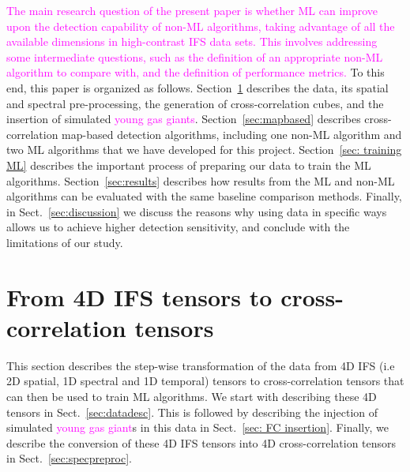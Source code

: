 \documentclass[referee]{aa} %
\newcommand{\newchange}[1]{\textcolor{magenta}{#1}}
\begin{document}
\newchange{The main research question of the present paper is whether ML can improve upon the detection capability of non-ML algorithms, taking advantage of all the available dimensions in high-contrast IFS data sets. This involves addressing some intermediate questions, such as the definition of an appropriate non-ML algorithm to compare with, and the definition of performance metrics.}
To this end, this paper is organized as follows. Section~\ref{sec:data} describes the data, its spatial and spectral pre-processing, the generation of cross-correlation cubes, and the insertion of simulated \newchange{young gas giants}.
Section~\ref{sec:mapbased} describes cross-correlation map-based detection algorithms, including one non-ML algorithm and two ML algorithms that we have developed for this project.
Section~\ref{sec: training ML} describes the important process of preparing our data to train the ML algorithms.
Section~\ref{sec:results} describes how results from the ML and non-ML algorithms can be evaluated with the same baseline comparison methods.
Finally, in Sect.~\ref{sec:discussion} we discuss the reasons why using data in specific ways allows us to achieve higher detection sensitivity, and conclude with the limitations of our study.
\section{From 4D IFS tensors to cross-correlation tensors}\label{sec:data}

This section describes the step-wise transformation of the data from 4D IFS (i.e 2D spatial, 1D spectral and 1D temporal) tensors to cross-correlation tensors that can then be used to train ML algorithms.
We start with describing these 4D tensors in Sect.~\ref{sec:datadesc}.
This is followed by describing the injection of simulated \newchange{young gas giant}s in this data in Sect.~\ref{sec: FC insertion}.
Finally, we describe the conversion of these 4D IFS tensors into 4D cross-correlation tensors in Sect.~\ref{sec:specpreproc}.
\end{document}
